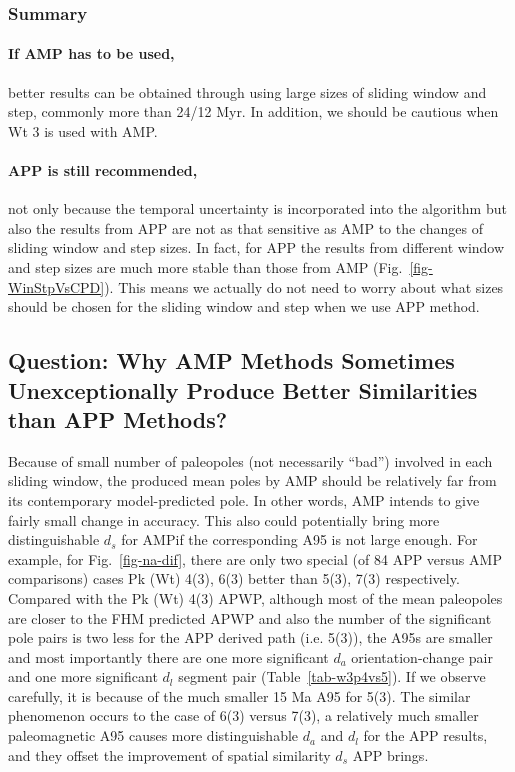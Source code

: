 \subsubsection{Summary}

\paragraph{If AMP has to be used,} better results can be obtained through
using large sizes of sliding window and step, commonly more than 24/12 Myr. In
addition, we should be cautious when Wt 3 is used with AMP\@.

\paragraph{APP is still recommended,} not only because the temporal uncertainty
is incorporated into the algorithm but also the results from APP are not as that
sensitive as AMP to the changes of sliding window and step sizes. In fact, for
APP the results from different window and step sizes are much more stable than
those from AMP (Fig.~\ref{fig-WinStpVsCPD}). This means we actually do not need
to worry about what sizes should be chosen for the sliding window and step when
we use APP method.

\subsection{Question: Why AMP Methods Sometimes Unexceptionally Produce Better
Similarities than APP Methods?}

Because of small number of paleopoles (not necessarily ``bad'') involved in
each sliding window, the produced mean poles by AMP should be relatively far
from its contemporary model-predicted pole. In other words, AMP intends to give
fairly small change in accuracy. This also could potentially bring more
distinguishable $d_s$ for AMP\@ if the corresponding A95 is not large enough.
For example, for Fig.~\ref{fig-na-dif}, there are only two special (of 84 APP
versus AMP comparisons) cases Pk (Wt) 4(3), 6(3) better than 5(3), 7(3)
respectively. Compared with the Pk (Wt) 4(3) APWP, although most of the mean
paleopoles are closer to the FHM predicted APWP and also the number of the
significant pole pairs is two less for the APP derived path (i.e. 5(3)), the A95s
are smaller and most importantly there are one more significant $d_a$
orientation-change pair and one more significant $d_l$ segment pair
(Table~\ref{tab-w3p4vs5}). If we observe carefully, it is because of the much
smaller 15 Ma A95 for 5(3). The similar phenomenon occurs to the case of 6(3)
versus 7(3), a relatively much smaller paleomagnetic A95 causes more distinguishable
$d_a$ and $d_l$ for the APP results, and they offset the improvement of spatial
similarity $d_s$ APP brings.

